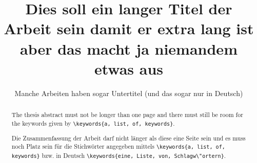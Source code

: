 \documentclass[online,a4paper,master]{isw}
\begin{document}
    \frontmatter
    
    \maketitle
    
    \begin{otherlanguage}{ngerman}
        \title{Dies soll ein langer Titel der Arbeit sein damit er extra lang ist aber das macht ja niemandem etwas aus}
        \subtitle{Manche Arbeiten haben sogar Untertitel (und das sogar nur in Deutsch)}
        
        \maketitle
    \end{otherlanguage}
    
    
    \DeclarationOfAuthorship
    
    \begin{abstract}
        The thesis abstract must not be longer than one page and there must still be room for the keywords given by \lstinline!\keywords{a, list, of, keywords}!.
        
        \lipsum[1-3]
    \end{abstract}
    
    \begin{otherlanguage}{ngerman}
        \begin{abstract}
            Die Zusammenfassung der Arbeit darf nicht l\"anger als diese eine Seite sein und es muss noch Platz sein f\"ur die Stichw\"orter angegeben mittels \lstinline!\keywords{a, list, of, keywords}! bzw. in Deutsch \lstinline!\keywords{eine, Liste, von, Schlagw\"ortern}!.
            
            \lipsum[4-6]
        \end{abstract}
    \end{otherlanguage}
    
\end{document}
